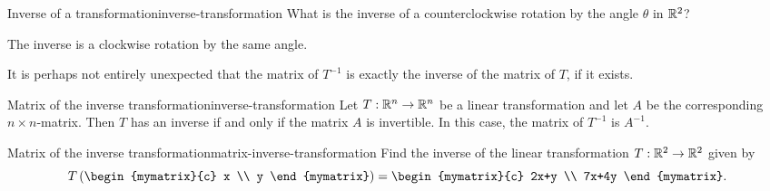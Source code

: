 \begin{example}{Inverse of a transformation}{inverse-transformation}
  What is the inverse of a counterclockwise rotation by the angle
  $\theta$ in $\mathbb{R}^2$?
\end{example}

\begin{solution}
  The inverse is a clockwise rotation by the same angle.
\end{solution}

It is perhaps not entirely unexpected that the matrix of $T^{-1}$ is
exactly the inverse of the matrix of $T$, if it exists.

\begin{theorem}{Matrix of the inverse transformation}{inverse-transformation}
  Let $T:\mathbb{R}^n \to \mathbb{R}^n$ be a linear transformation and let $A$ be the
  corresponding $n\times n$-matrix. Then $T$ has an inverse if and
  only if the matrix $A$ is invertible. In this case, the matrix of
  $T^{-1}$ is $A^{-1}$.
\end{theorem}

\begin{example}{Matrix of the inverse transformation}{matrix-inverse-transformation}
  Find the inverse of the linear transformation $T:\mathbb{R}^2\to\mathbb{R}^2$ given
  by
  \begin{equation*}
    T\paren{\begin{mymatrix}{c} x \\ y \end{mymatrix}}
    = \begin{mymatrix}{c} 2x+y \\ 7x+4y \end{mymatrix}.
  \end{equation*}
\end{example}

